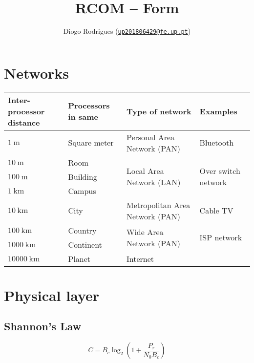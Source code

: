 \documentclass{form}
\author{Diogo Rodrigues (\texttt{\href{mailto:up201806429@fe.up.pt}{up201806429@fe.up.pt}})}
\title{RCOM -- Form}
\begin{document}
\noindent%
\begin{minipage}{0.75\textwidth}
    \section*{Networks}
    \begin{tabular}{p{16mm} | p{21mm} | l | l}
        \textbf{Inter-processor distance} & \textbf{Processors in same} & \textbf{Type of network} & \textbf{Examples} \\ \hline
        $\SI{    1}{     \meter}$ & Square meter & Personal Area Network (PAN)               & Bluetooth \\ \hline
        $\SI{   10}{     \meter}$ & Room         & \multirow{3}{*}{Local Area Network (LAN)} & \multirow{3}{*}{Over switch network} \\ \cline{1-2}
        $\SI{  100}{     \meter}$ & Building     &                                           & \\ \cline{1-2}
        $\SI{    1}{\kilo\meter}$ & Campus       &                                           & \\ \hline
        $\SI{   10}{\kilo\meter}$ & City         & Metropolitan Area Network (PAN)           & Cable TV \\ \hline
        $\SI{  100}{\kilo\meter}$ & Country      & \multirow{2}{*}{Wide Area Network (PAN)}  & \multirow{2}{*}{ISP network} \\ \cline{1-2}
        $\SI{ 1000}{\kilo\meter}$ & Continent    &                                           & \\ \hline
        $\SI{10000}{\kilo\meter}$ & Planet       & Internet                                  & \\
    \end{tabular}
\end{minipage}%
\begin{minipage}{0.25\textwidth}
    \section*{Physical layer}
    \subsection*{Shannon's Law}
    \begin{equation*}
        C = B_c \log_2{\left(1+\frac{P_r}{N_0 B_c}\right)}
    \end{equation*}
\end{minipage}
\end{document}
